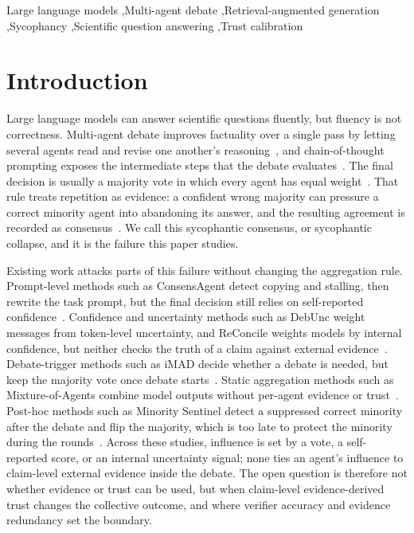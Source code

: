 \documentclass[a4paper,fleqn]{cas-sc}
\begin{document}
\begin{keywords}
  Large language models \sep Multi-agent debate \sep  Retrieval-augmented generation \sep  Sycophancy \sep Scientific question answering \sep Trust calibration
\end{keywords}

\maketitle
\linenumbers
\section{Introduction}\label{sec1}

Large language models can answer scientific questions fluently, but fluency is not correctness. Multi-agent debate improves factuality over a single pass by letting several agents read and revise one another's reasoning~\cite{du2024improving}, and chain-of-thought prompting exposes the intermediate steps that the debate evaluates~\cite{wei2022chain}. The final decision is usually a majority vote in which every agent has equal weight~\cite{choi2025debate}. That rule treats repetition as evidence: a confident wrong majority can pressure a correct minority agent into abandoning its answer, and the resulting agreement is recorded as consensus~\cite{pitre-etal-2025-consensagent}. We call this sycophantic consensus, or sycophantic collapse, and it is the failure this paper studies.

Existing work attacks parts of this failure without changing the aggregation rule. Prompt-level methods such as ConsensAgent detect copying and stalling, then rewrite the task prompt, but the final decision still relies on self-reported confidence~\cite{pitre-etal-2025-consensagent}. Confidence and uncertainty methods such as DebUnc weight messages from token-level uncertainty, and ReConcile weights models by internal confidence, but neither checks the truth of a claim against external evidence~\cite{yoffe-etal-2025-debunc,chen2024reconcile}. Debate-trigger methods such as iMAD decide whether a debate is needed, but keep the majority vote once debate starts~\cite{fan2026imad}. Static aggregation methods such as Mixture-of-Agents combine model outputs without per-agent evidence or trust~\cite{wang2025mixture}. Post-hoc methods such as Minority Sentinel detect a suppressed correct minority after the debate and flip the majority, which is too late to protect the minority during the rounds~\cite{he2026minority}. Across these studies, influence is set by a vote, a self-reported score, or an internal uncertainty signal; none ties an agent's influence to claim-level external evidence inside the debate. The open question is therefore not whether evidence or trust can be used, but when claim-level evidence-derived trust changes the collective outcome, and where verifier accuracy and evidence redundancy set the boundary.
\end{document}
